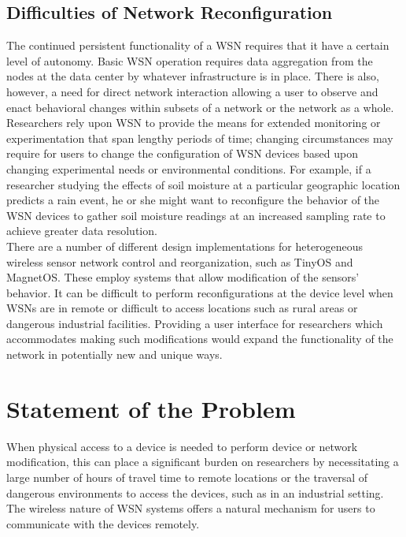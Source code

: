 \subsection{Difficulties of Network Reconfiguration}

The continued persistent functionality of a WSN requires that it have a certain level of autonomy. Basic WSN operation requires data aggregation from the nodes at the data center by whatever infrastructure is in place. There is also, however, a need for direct network interaction allowing a user to observe and enact behavioral changes within subsets of a network or the network as a whole. Researchers rely upon WSN to provide the means for extended monitoring or experimentation that span lengthy periods of time; changing circumstances may require for users to change the configuration of WSN devices based upon changing experimental needs or environmental conditions. For example, if a researcher studying the effects of soil moisture at a particular geographic location predicts a rain event, he or she might want to reconfigure the behavior of the WSN devices to gather soil moisture readings at an increased sampling rate to achieve greater data resolution.\\ 

There are a number of different design implementations for heterogeneous wireless sensor network control and reorganization, such as TinyOS and MagnetOS. These employ systems that allow modification of the sensors' behavior. It can be difficult to perform reconfigurations at the device level when WSNs are in remote or difficult to access locations such as rural areas or dangerous industrial facilities. Providing a user interface for researchers which accommodates making such modifications would expand the functionality of the network in potentially new and unique ways.

\section{Statement of the Problem}

When physical access to a device is needed to perform device or network modification, this can place a significant burden on researchers by necessitating a large number of hours of travel time to remote locations or the traversal of dangerous environments to access the devices, such as in an industrial setting. The wireless nature of WSN systems offers a natural mechanism for users to communicate with the devices remotely.\\ 

